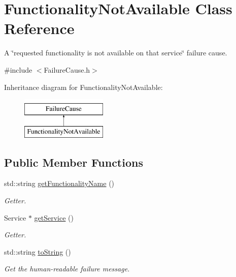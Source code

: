 \hypertarget{class_functionality_not_available}{}\section{Functionality\+Not\+Available Class Reference}
\label{class_functionality_not_available}


A \char`\"{}requested functionality is not available on that service\char`\"{} failure cause.  




{\ttfamily \#include $<$Failure\+Cause.\+h$>$}

Inheritance diagram for Functionality\+Not\+Available\+:\begin{figure}[H]
\begin{center}
\leavevmode
\includegraphics[height=2.000000cm]{class_functionality_not_available}
\end{center}
\end{figure}
\subsection*{Public Member Functions}
\begin{DoxyCompactItemize}
\item 
std\+::string \hyperlink{class_functionality_not_available_af76d66ef74d486ec9eb403326aa10084}{get\+Functionality\+Name} ()
\begin{DoxyCompactList}\small\item\em Getter. \end{DoxyCompactList}\item 
Service $\ast$ \hyperlink{class_functionality_not_available_ac356ec72727c405f3a77d2a966312ca1}{get\+Service} ()
\begin{DoxyCompactList}\small\item\em Getter. \end{DoxyCompactList}\item 
std\+::string \hyperlink{class_functionality_not_available_a06c66f75f62a42042e16f8462cc7e0ea}{to\+String} ()
\begin{DoxyCompactList}\small\item\em Get the human-\/readable failure message. \end{DoxyCompactList}\end{DoxyCompactItemize}


